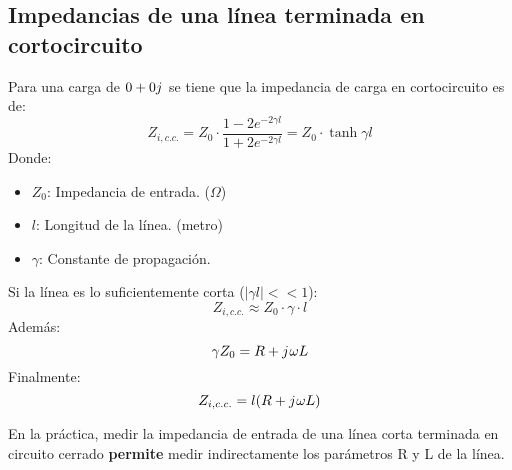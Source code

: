 \documentclass[
	12pt, %
	fleqn, %
	a4paper, %
	oneside, %
]{LegrandOrangeBook}
\begin{document}
\subsection{Impedancias de una línea terminada en cortocircuito}
\begin{definition}
Para una carga de $0+0{j\mkern1mu}$ se tiene que la impedancia de carga en cortocircuito es de:
\begin{equation}
Z_{i,c.c.}=Z_0\cdot\frac{1-2e^{-2\gamma l}}{1+2e^{-2\gamma l}}=Z_0\cdot\tanh\gamma l
\label{eq:imp corto}
\end{equation}
Donde:
\begin{itemize}
\item $Z_0$: Impedancia de entrada. ($\Omega$)
\item $l$: Longitud de la línea. (metro)
\item $\gamma$: Constante de propagación.
\end{itemize}
Si la línea es lo suficientemente corta ($|\gamma l|<<1$):
\begin{equation*}
Z_{i,c.c.}\approx Z_0\cdot\gamma\cdot l
\end{equation*}
Además:
\begin{equation}
\gamma Z_0=R+{j\mkern1mu}\omega L
\label{eq:gamma z0}
\end{equation}
Finalmente:
\begin{equation}
Z_{i,c.c.}=l(R+{j\mkern1mu}\omega L)
\end{equation}
\end{definition}
\begin{remark}
En la práctica, medir la impedancia de entrada de una línea corta terminada en circuito cerrado \textbf{permite} medir indirectamente los parámetros R y L de la línea.
\end{remark}
\end{document}

